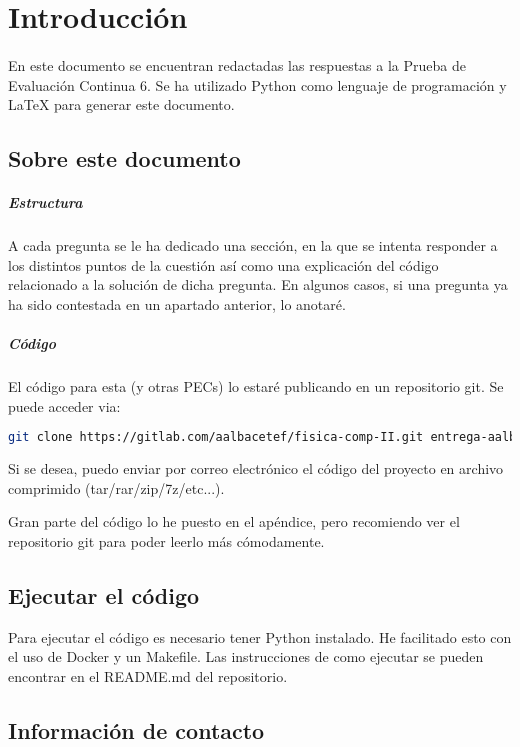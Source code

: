 %
%

\section{Introducción}

\paragraph{}
En este documento se encuentran redactadas las respuestas a la Prueba de Evaluación Continua 6. Se ha utilizado Python como lenguaje de programación y LaTeX para generar este documento.

\subsection{Sobre este documento}

\subparagraph{Estructura}
A cada pregunta se le ha dedicado una sección, en la que se intenta responder a los distintos puntos de la cuestión así como una explicación del código relacionado a la solución de dicha pregunta. En algunos casos, si una pregunta ya ha sido contestada en un apartado anterior, lo anotaré. 

\subparagraph{Código}
El código para esta (y otras PECs) lo estaré publicando en un repositorio git. Se puede acceder via:

\begin{lstlisting}[language=bash]
	git clone https://gitlab.com/aalbacetef/fisica-comp-II.git entrega-aalbacetef-fc-ii
\end{lstlisting}


Si se desea, puedo enviar por correo electrónico el código del proyecto en archivo comprimido (tar/rar/zip/7z/etc...).

Gran parte del código lo he puesto en el apéndice, pero recomiendo ver el repositorio git para poder leerlo más cómodamente.


\subsection{Ejecutar el código}

Para ejecutar el código es necesario tener Python instalado. He facilitado esto con el uso de Docker y un Makefile. Las instrucciones de como ejecutar se pueden encontrar en el README.md del repositorio.

\subsection{Información de contacto}

